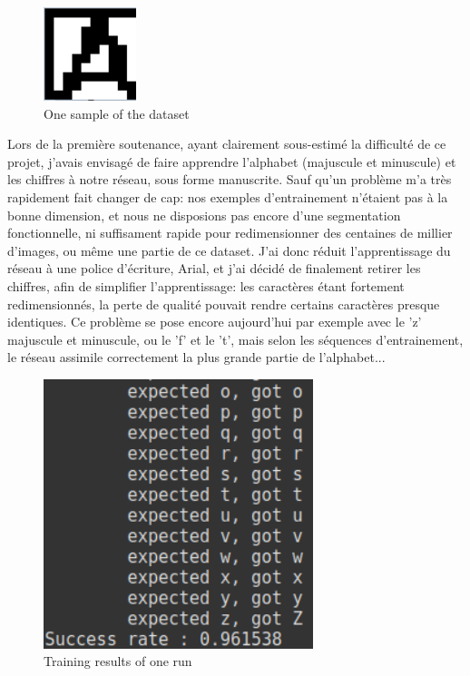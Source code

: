 \documentclass[12pt]{report}
\begin{document}
\begin{figure}[H]
    \centering
    \includegraphics[width=0.24\textwidth]{dataset_sample}
    \caption{One sample of the dataset}
\end{figure}

Lors de la première soutenance, ayant clairement sous-estimé la difficulté de ce projet, j'avais envisagé de faire apprendre l'alphabet (majuscule et minuscule) et les chiffres à notre réseau, sous forme manuscrite. Sauf qu'un problème m'a très rapidement fait changer de cap: nos exemples d'entrainement n'étaient pas à la bonne dimension, et nous ne disposions pas encore d'une segmentation fonctionnelle, ni suffisament rapide pour redimensionner des centaines de millier d'images, ou même une partie de ce dataset. J'ai donc réduit l'apprentissage du réseau à une police d'écriture, Arial, et j'ai décidé de finalement retirer les chiffres, afin de simplifier l'apprentissage: les caractères étant fortement redimensionnés, la perte de qualité pouvait rendre certains caractères presque identiques. Ce problème se pose encore aujourd'hui par exemple avec le 'z' majuscule et minuscule, ou le 'f' et le 't', mais selon les séquences d'entrainement, le réseau assimile correctement la plus grande partie de l'alphabet...

\begin{figure}[H]
    \centering
    \includegraphics[width=0.7\textwidth]{training}
    \caption{Training results of one run}
\end{figure}
\end{document}
